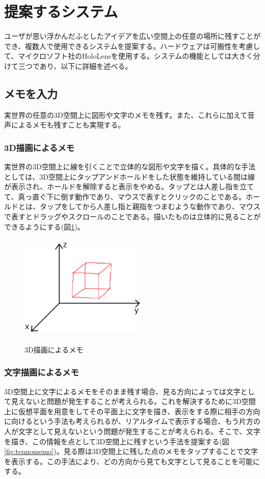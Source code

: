 \documentclass{hissymp}
\begin{document}
\section{提案するシステム}
ユーザが思い浮かんだふとしたアイデアを広い空間上の任意の場所に残すことができ、複数人で使用できるシステムを提案する。ハードウェアは可搬性を考慮して、マイクロソフト社のHoloLens\cite{tex6}を使用する。システムの機能としては大きく分けて三つであり、以下に詳細を述べる。

\subsection{メモを入力}
実世界の任意の3D空間上に図形や文字のメモを残す。また、これらに加えて音声によるメモも残すことも実現する。
\subsubsection{3D描画によるメモ}
実世界の3D空間上に線を引くことで立体的な図形や文字を描く。具体的な手法としては、3D空間上にタップアンドホールドをした状態を維持している間は線が表示され、ホールドを解除すると表示をやめる。タップとは人差し指を立てて、真っ直ぐ下に倒す動作であり、マウスで表すとクリックのことである。ホールドとは、タップをしてから人差し指と親指をつまむような動作であり、マウスで表すとドラッグやスクロールのことである。描いたものは立体的に見ることができるようにする(図\ref{fig:3d_draw})。

\begin{figure}[h]
  \begin{center}
    \includegraphics[clip,height=5.0cm,width=6.0cm]{./3d_draw.eps}
    \caption{3D描画によるメモ}
    \label{fig:3d_draw}
  \end{center}
\end{figure}

\subsubsection{文字描画によるメモ}
3D空間上に文字によるメモをそのまま残す場合、見る方向によっては文字として見えないと問題が発生することが考えられる。これを解決するために3D空間上に仮想平面を用意をしてその平面上に文字を描き、表示をする際に相手の方向に向けるという手法も考えられるが、リアルタイムで表示する場合、もう片方の人が文字として見えないという問題が発生することが考えられる。そこで、文字を描き、この情報を点として3D空間上に残すという手法を提案する(図\ref{fig:tennomemo})。見る際は3D空間上に残した点のメモをタップすることで文字を表示する。この手法により、どの方向から見ても文字として見ることを可能にする。
\end{document}
